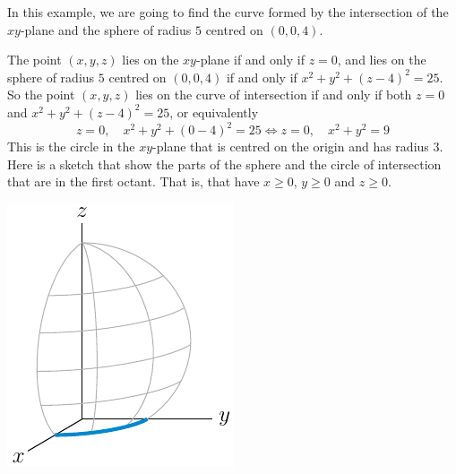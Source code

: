 \begin{eg}
In this example, we are going to find the curve formed by the intersection of the $xy$-plane and the sphere of radius $5$ centred on $(0,0,4)$. 

The point $(x,y,z)$ lies on the $xy$-plane if and only if $z=0$, and lies on the  
sphere of radius $5$ centred on $(0,0,4)$ if and only if
$x^2+y^2+(z-4)^2=25$. So the point $(x,y,z)$ lies on the curve of intersection if and only if both $z=0$ and $x^2+y^2+(z-4)^2=25$, or equivalently
\begin{equation*}
z=0,\quad x^2+y^2+(0-4)^2=25
\iff
z=0,\quad x^2+y^2 = 9
\end{equation*}
This is the circle in the $xy$-plane that is centred on the origin and
has radius $3$. Here is a sketch that show the parts of the sphere 
and the circle of intersection that are in the first octant. That is, that
have $x\ge 0$, $y\ge 0$ and $z\ge 0$.
\begin{efig}
\begin{center}
   \includegraphics{sphereCircle.pdf}
\end{center}
\end{efig}
\end{eg}

